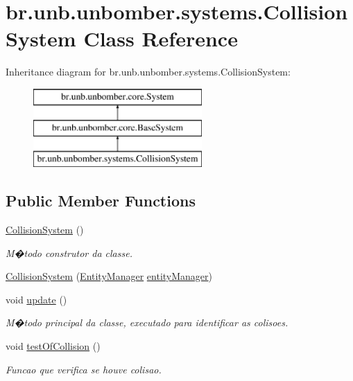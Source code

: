 \hypertarget{classbr_1_1unb_1_1unbomber_1_1systems_1_1_collision_system}{\section{br.\+unb.\+unbomber.\+systems.\+Collision\+System Class Reference}
\label{classbr_1_1unb_1_1unbomber_1_1systems_1_1_collision_system}
}
Inheritance diagram for br.\+unb.\+unbomber.\+systems.\+Collision\+System\+:\begin{figure}[H]
\begin{center}
\leavevmode
\includegraphics[height=3.000000cm]{classbr_1_1unb_1_1unbomber_1_1systems_1_1_collision_system}
\end{center}
\end{figure}
\subsection*{Public Member Functions}
\begin{DoxyCompactItemize}
\item 
\hyperlink{classbr_1_1unb_1_1unbomber_1_1systems_1_1_collision_system_a75a6f5b88cd4b719a55b907ea6cee274}{Collision\+System} ()
\begin{DoxyCompactList}\small\item\em M�todo construtor da classe. \end{DoxyCompactList}\item 
\hyperlink{classbr_1_1unb_1_1unbomber_1_1systems_1_1_collision_system_a40e0e2849d512f95f6082bec10b831b7}{Collision\+System} (\hyperlink{interfacebr_1_1unb_1_1unbomber_1_1core_1_1_entity_manager}{Entity\+Manager} \hyperlink{classbr_1_1unb_1_1unbomber_1_1core_1_1_base_system_acb388352563da4567a9641f97b7931ca}{entity\+Manager})
\item 
void \hyperlink{classbr_1_1unb_1_1unbomber_1_1systems_1_1_collision_system_ae4a5755b3e48138cee8350d41fed43b3}{update} ()
\begin{DoxyCompactList}\small\item\em M�todo principal da classe, executado para identificar as colisoes. \end{DoxyCompactList}\item 
void \hyperlink{classbr_1_1unb_1_1unbomber_1_1systems_1_1_collision_system_abb605c101fe1d964afee5d656f03235e}{test\+Of\+Collision} ()
\begin{DoxyCompactList}\small\item\em Funcao que verifica se houve colisao. \end{DoxyCompactList}\end{DoxyCompactItemize}
